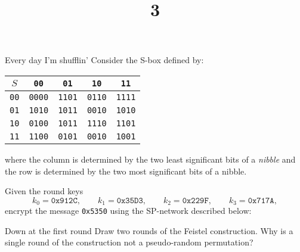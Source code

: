 \documentclass{practice}
\title{3}
\date{\DTMdate{2024-09-25}}
\begin{document}
\maketitle

\begin{task}{Every day I'm shufflin'}
  Consider the S-box defined by:
  \begin{table}[h!]
    \centering
    \begin{tabular}{|c|c|c|c|c|}
      \hline
      $S$ & \texttt{00} & \texttt{01} & \texttt{10} & \texttt{11}\\\hline
      \texttt{00} & \texttt{0000} & \texttt{1101} & \texttt{0110} & \texttt{1111} \\
      \texttt{01} & \texttt{1010} & \texttt{1011} & \texttt{0010} & \texttt{1010} \\
      \texttt{10} & \texttt{0100} & \texttt{1011} & \texttt{1110} & \texttt{1101} \\
      \texttt{11} & \texttt{1100} & \texttt{0101} & \texttt{0010} & \texttt{1001}\\\hline
    \end{tabular}
    \vspace*{-0.7em}
  \end{table}

  where the column is determined by the two least significant bits of a \emph{nibble} and the row is determined by the two most significant bits of a nibble.

  Given the round keys
  \[
    k_0 = \texttt{0x912C},\qquad
    k_1 = \texttt{0x35D3},\qquad
    k_2 = \texttt{0x229F},\qquad
    k_3 = \texttt{0x717A},
  \]
  encrypt the message \texttt{0x5350} using the SP-network described below:
 
  \begin{figure}[h!]
    \centering
    
  \end{figure}
\end{task}

\newpage

\begin{task}{Down at the first round}
  Draw two rounds of the Feistel construction.
  Why is a single round of the construction not a pseudo-random permutation?
\end{task}
\end{document}

